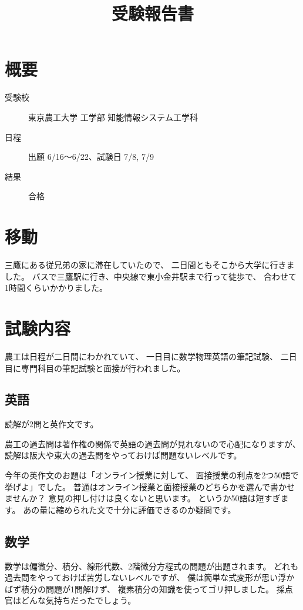 \documentclass[]{jsarticle}
\title{受験報告書}
\date{}
\begin{document}
\maketitle
\section*{概要}
    \begin{description}
        \item[受験校] 東京農工大学 工学部 知能情報システム工学科
        \item[日程] 出願 6/16〜6/22、試験日 7/8, 7/9
        \item[結果] 合格
    \end{description}
\section*{移動}
    三鷹にある従兄弟の家に滞在していたので、
    二日間ともそこから大学に行きました。
    バスで三鷹駅に行き、中央線で東小金井駅まで行って徒歩で、
    合わせて1時間くらいかかりました。
\section*{試験内容}
    農工は日程が二日間にわかれていて、
    一日目に数学物理英語の筆記試験、
    二日目に専門科目の筆記試験と面接が行われました。
    \subsection*{英語}
        読解が2問と英作文です。
        
        
        農工の過去問は著作権の関係で英語の過去問が見れないので心配になりますが、
        読解は阪大や東大の過去問をやっておけば問題ないレベルです。

        今年の英作文のお題は「オンライン授業に対して、
        面接授業の利点を2つ50語で挙げよ」でした。
        普通はオンライン授業と面接授業のどちらかを選んで書かせませんか？
        意見の押し付けは良くないと思います。
        というか50語は短すぎます。
        あの量に縮められた文で十分に評価できるのか疑問です。
    \subsection*{数学}
        数学は偏微分、積分、線形代数、2階微分方程式の問題が出題されます。
        どれも過去問をやっておけば苦労しないレベルですが、
        僕は簡単な式変形が思い浮かばず積分の問題が1問解けず、
        複素積分の知識を使ってゴリ押しました。
        採点官はどんな気持ちだったでしょう。
\end{document}
